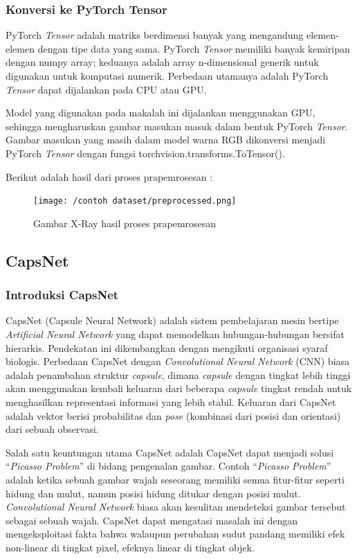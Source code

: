 \documentclass{article}
\begin{document}
    	\subsubsection{Konversi ke PyTorch Tensor}
    	PyTorch \textit{Tensor} adalah matriks berdimensi banyak yang mengandung elemen-elemen dengan tipe data yang sama. PyTorch \textit{Tensor} memiliki banyak kemiripan dengan numpy array; keduanya adalah array n-dimensional generik untuk digunakan untuk komputasi numerik. Perbedaan utamanya adalah PyTorch \textit{Tensor} dapat dijalankan pada CPU atau GPU.
    	\par
    	Model yang digunakan pada makalah ini dijalankan menggunakan GPU, sehingga mengharuskan gambar masukan masuk dalam bentuk PyTorch \textit{Tensor}. Gambar masukan yang masih dalam model warna RGB dikonversi menjadi PyTorch \textit{Tensor} dengan fungsi torchvision.transforms.ToTensor(). 
    	
    	\par
    	Berikut adalah hasil dari proses prapemrosesan :
    	\begin{figure}[H]
    		\centering
    		\texttt{[image: /contoh dataset/preprocessed.png]}
    		\caption{Gambar X-Ray hasil proses prapemrosesan}
		\end{figure} 

    \subsection{CapsNet}
	   	\subsubsection{Introduksi CapsNet}
	   	CapsNet (Capsule Neural Network) adalah sistem pembelajaran mesin bertipe \textit{Artificial Neural Network} yang dapat memodelkan hubungan-hubungan bersifat hierarkis. Pendekatan ini dikembangkan dengan mengikuti organisasi syaraf biologis. Perbedaan CapsNet dengan \textit{Convolutional Neural Network} (CNN) biasa adalah penambahan struktur \textit{capsule}, dimana \textit{capsule} dengan tingkat lebih tinggi akan menggunakan kembali keluaran dari beberapa \textit{capsule} tingkat rendah untuk menghasilkan representasi informasi yang lebih stabil. Keluaran dari CapsNet adalah vektor berisi probabilitas dan \textit{pose} (kombinasi dari posisi dan orientasi) dari sebuah observasi. 
	   	\par
	   	Salah satu keuntungan utama CapsNet adalah CapsNet dapat menjadi solusi “\textit{Picasso Problem}” di bidang pengenalan gambar. Contoh “\textit{Picasso Problem}” adalah ketika sebuah gambar wajah seseorang memiliki semua fitur-fitur seperti hidung dan mulut, namun posisi hidung ditukar dengan posisi mulut. \textit{Convolutional Neural Network} biasa akan kesulitan mendeteksi gambar tersebut sebagai sebuah wajah. CapsNet dapat mengatasi masalah ini dengan mengeksploitasi fakta bahwa walaupun perubahan sudut pandang memiliki efek non-linear di tingkat pixel, efeknya linear di tingkat objek.
	   	
\end{document}
